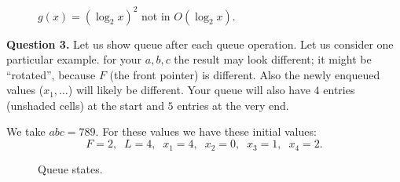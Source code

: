 \documentclass[a4paper,12pt]{article}
\begin{document}
\begin{figure}[!htb]
\caption{\label{fig:solution-log-log-graph2} 
${\displaystyle g(x) = \left(\log_2 x\right)^2}$ not in $O(\log_2 x)$.}
\end{figure}




\vspace{20pt}
{\bf Question 3.} Let us show queue after each queue operation. 
Let us consider one particular example. for your $a,b,c$ the
result may look different; it might be ``rotated'', because
$F$ (the front pointer) is different. Also the newly enqueued
values ($x_1, \ldots$) will likely be different. Your queue 
will also have $4$ entries (unshaded cells) at the start 
and $5$ entries at the very end.

We take $abc = 789$. For these values we have these initial values:
{\footnotesize
$$F = 2,\;\;L = 4,\;\;x_1 = 4,\;\;x_2 = 0,\;\;x_3 = 1,\;\;x_4 = 2.$$
}


\begin{figure}[!htb]
\caption{\label{fig:solution-prob3} Queue states.}
\end{figure}
\end{document}

